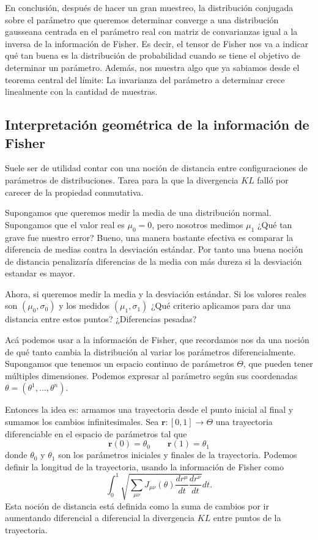 En conclusi\'on, despu\'es de hacer un gran muestreo, la distribuci\'on conjugada sobre el par\'ametro que queremos determinar converge a una distribuci\'on gausseana centrada en el par\'ametro real con matriz de convarianzas igual a la inversa de la informaci\'on de Fisher. Es decir, el tensor de Fisher nos va a indicar qu\'e tan buena es la distribuci\'on de probabilidad cuando se tiene el objetivo de determinar un par\'ametro. Adem\'as, nos muestra algo que ya sabiamos desde el teorema central del l\'imite: La invarianza del par\'ametro a determinar crece linealmente con la cantidad de muestras.

\subsection{Interpretaci\'on geom\'etrica de la informaci\'on de Fisher}

Suele ser de utilidad contar con una noci\'on de distancia entre configuraciones de parámetros de distribuciones. Tarea para la que la divergencia $KL$ falló por carecer de la propiedad conmutativa.

Supongamos que queremos medir la media de una distribuci\'on normal. Supongamos que el valor real es $\mu_0 = 0$, pero nosotros medimos $\mu_1$ ¿Qué tan grave fue nuestro error? Bueno, una manera bastante efectiva es comparar la diferencia de medias contra la desviación estándar. Por tanto una buena noción de distancia penalizaría diferencias de la media con más dureza si la desviación estandar es mayor.

Ahora, si queremos medir la media y la desviación estándar. Si los valores reales son $(\mu_0,\sigma_0)$ y los medidos $(\mu_1,\sigma_1)$ ¿Qué criterio aplicamos para dar una distancia entre estos puntos? ¿Diferencias pesadas?

Acá podemos usar a la información de Fisher, que recordamos nos da una noción de qué tanto cambia la distribuci\'on al variar los par\'ametros diferencialmente. Supongamos que tenemos un espacio continuo de par\'ametros $\Theta$, que pueden tener m\'ultiples dimensiones. Podemos expresar al par\'ametro seg\'un sus coordenadas $\theta = (\theta^1,...,\theta^n)$.


Entonces la idea es: armamos una trayectoria desde el punto inicial al final y sumamos los cambios infinitesimales. Sea $\mathbf{r}:[0,1]\to \Theta$ una trayectoria diferenciable en el espacio de par\'ametros tal que
\begin{equation}
    \mathbf{r}(0) = \theta_0
    \qquad
    \mathbf{r}(1) = \theta_1
\end{equation}
donde $\theta_0$ y $\theta_1$ son los par\'ametros iniciales y finales de la trayectoria. 
Podemos definir la longitud de la trayectoria, usando la informaci\'on de Fisher como
\begin{equation}
    \int_0^1 \sqrt{\sum_{\mu\nu}J_{\mu\nu}(\theta)\frac{dr^\mu}{dt}\frac{dr^\nu}{dt}}dt.
\end{equation}
Esta noci\'on de distancia est\'a definida como la suma de cambios por ir aumentando diferencial a diferencial la divergencia $KL$ entre puntos de la trayectoria.

